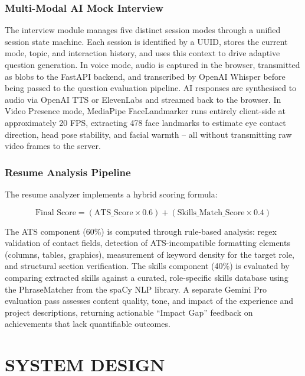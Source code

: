 \documentclass[12pt,a4paper]{report}
\begin{document}
\subsection{Multi-Modal AI Mock Interview}

The interview module manages five distinct session modes through a unified session state machine. Each session is identified by a UUID, stores the current mode, topic, and interaction history, and uses this context to drive adaptive question generation. In voice mode, audio is captured in the browser, transmitted as blobs to the FastAPI backend, and transcribed by OpenAI Whisper before being passed to the question evaluation pipeline. AI responses are synthesised to audio via OpenAI TTS or ElevenLabs and streamed back to the browser. In Video Presence mode, MediaPipe FaceLandmarker runs entirely client-side at approximately 20 FPS, extracting 478 face landmarks to estimate eye contact direction, head pose stability, and facial warmth -- all without transmitting raw video frames to the server.

\subsection{Resume Analysis Pipeline}

The resume analyzer implements a hybrid scoring formula:

\begin{equation}
    \text{Final Score} = (\text{ATS\_Score} \times 0.6) + (\text{Skills\_Match\_Score} \times 0.4)
\end{equation}

The ATS component (60\%) is computed through rule-based analysis: regex validation of contact fields, detection of ATS-incompatible formatting elements (columns, tables, graphics), measurement of keyword density for the target role, and structural section verification. The skills component (40\%) is evaluated by comparing extracted skills against a curated, role-specific skills database using the PhraseMatcher from the spaCy NLP library. A separate Gemini Pro evaluation pass assesses content quality, tone, and impact of the experience and project descriptions, returning actionable ``Impact Gap'' feedback on achievements that lack quantifiable outcomes.

\chapter{SYSTEM DESIGN}
\end{document}
